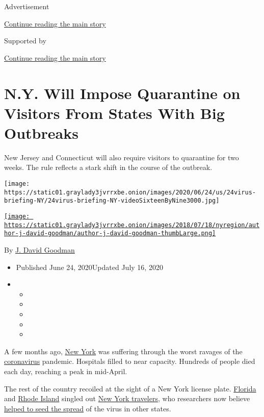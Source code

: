 Advertisement

\protect\hyperlink{after-top}{Continue reading the main story}

Supported by

\protect\hyperlink{after-sponsor}{Continue reading the main story}

\hypertarget{ny-will-impose-quarantine-on-visitors-from-states-with-big-outbreaks}{%
\section{N.Y. Will Impose Quarantine on Visitors From States With Big
Outbreaks}\label{ny-will-impose-quarantine-on-visitors-from-states-with-big-outbreaks}}

New Jersey and Connecticut will also require visitors to quarantine for
two weeks. The rule reflects a stark shift in the course of the
outbreak.

\texttt{[image: https://static01.graylady3jvrrxbe.onion/images/2020/06/24/us/24virus-briefing-NY/24virus-briefing-NY-videoSixteenByNine3000.jpg]}

\href{https://www.nytimes3xbfgragh.onion/by/j-david-goodman}{\texttt{[image: https://static01.graylady3jvrrxbe.onion/images/2018/07/18/nyregion/author-j-david-goodman/author-j-david-goodman-thumbLarge.png]}}

By \href{https://www.nytimes3xbfgragh.onion/by/j-david-goodman}{J. David
Goodman}

\begin{itemize}
\item
  Published June 24, 2020Updated July 16, 2020
\item
  \begin{itemize}
  \item
  \item
  \item
  \item
  \item
  \end{itemize}
\end{itemize}

A few months ago,
\href{https://www.nytimes3xbfgragh.onion/2020/07/14/nyregion/coronavirus-ny-travel-cuomo.html}{New
York} was suffering through the worst ravages of the
\href{https://www.nytimes3xbfgragh.onion/2020/07/16/travel/virus-vacation.html}{coronavirus}
pandemic. Hospitals filled to near capacity. Hundreds of people died
each day, reaching a peak in mid-April.

The rest of the country recoiled at the sight of a New York license
plate.
\href{https://www.flgov.com/wp-content/uploads/orders/2020/EO_20-82.pdf}{Florida}
and
\href{https://www.democratandchronicle.com/story/news/politics/albany/2020/03/29/coronavirus-rhode-repeals-new-york-quarantine-order/2935388001/}{Rhode
Island} singled out
\href{https://www.nytimes3xbfgragh.onion/2020/07/14/nyregion/ny-quarantine-rules.html}{New
York travelers}, who researchers now believe
\href{https://www.nytimes3xbfgragh.onion/2020/05/07/us/new-york-city-coronavirus-outbreak.html}{helped
to seed the spread} of the virus in other states.

